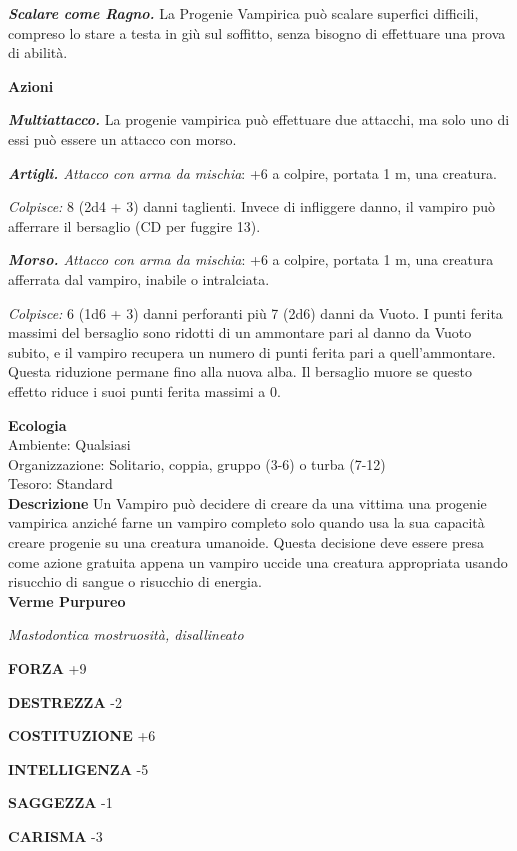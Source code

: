 \begin{multicols}{2}
\emph{\textbf{Scalare come Ragno.}} La Progenie Vampirica può scalare superfici difficili, compreso lo stare a testa in giù sul soffitto, senza bisogno di effettuare una prova di abilità.

\textbf{Azioni}

\emph{\textbf{Multiattacco.}} La progenie vampirica può effettuare due attacchi, ma solo uno di essi può essere un attacco con morso.

\emph{\textbf{Artigli.} Attacco con arma da mischia}: +6 a colpire, portata 1 m, una creatura.

\emph{Colpisce:} 8 (2d4 + 3) danni taglienti. Invece di infliggere danno, il vampiro può afferrare il bersaglio (CD per fuggire 13). 

\emph{\textbf{Morso.} Attacco con arma da mischia}: +6 a colpire, portata 1 m, una creatura afferrata dal vampiro, inabile o intralciata.

\emph{Colpisce:} 6 (1d6 + 3) danni perforanti più 7 (2d6) danni da Vuoto. I punti ferita massimi del bersaglio sono ridotti di un ammontare pari al danno da Vuoto subito, e il vampiro recupera un numero di punti ferita pari a quell'ammontare. Questa riduzione permane fino alla nuova alba. Il bersaglio muore se questo effetto riduce i suoi punti ferita massimi a 0.

\textbf{Ecologia}\\
Ambiente: Qualsiasi\\
Organizzazione: Solitario, coppia, gruppo (3-6) o turba (7-12)\\
Tesoro: Standard\\
\textbf{Descrizione}
Un Vampiro può decidere di creare da una vittima una progenie vampirica anziché farne un vampiro completo solo quando usa la sua capacità creare progenie su una creatura umanoide. Questa decisione deve essere presa come azione gratuita appena un vampiro uccide una creatura appropriata usando risucchio di sangue o risucchio di energia. \\


\medskip{}\textbf{Verme Purpureo}

\emph{Mastodontica mostruosità, disallineato}

\textbf{FORZA} +9

\textbf{DESTREZZA} -2

\textbf{COSTITUZIONE} +6

\textbf{INTELLIGENZA} -5

\textbf{SAGGEZZA} -1

\textbf{CARISMA} -3


\end{multicols}
